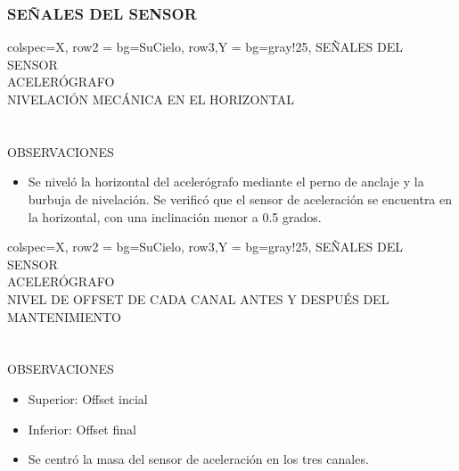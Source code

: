 \subsubsection{SEÑALES DEL SENSOR}
\begin{tblr}{
        colspec={X},
        row{2} = {bg=SuCielo},
        row{3,Y} = {bg=gray!25},
    } %
    SEÑALES DEL SENSOR \\
    ACELERÓGRAFO \MakeUppercase{} \\
    NIVELACIÓN MECÁNICA EN EL HORIZONTAL \\
      \\
     \\
    OBSERVACIONES \\
    \begin{itemize}
        \item Se niveló la horizontal del acelerógrafo mediante el perno de anclaje y la burbuja de nivelación. Se verificó que el sensor de aceleración se encuentra en la horizontal, con una inclinación menor a 0.5 grados.
    \end{itemize}
\end{tblr}
% 
\newpage
\begin{tblr}{
        colspec={X},
        row{2} = {bg=SuCielo},
        row{3,Y} = {bg=gray!25},
    } %
    SEÑALES DEL SENSOR \\
    ACELERÓGRAFO \MakeUppercase{} \\
    NIVEL DE OFFSET DE CADA CANAL ANTES Y DESPUÉS DEL MANTENIMIENTO \\
     \\
     \\
    OBSERVACIONES \\
    \begin{itemize}
        \item Superior: Offset incial
        \item Inferior: Offset final
        \item Se centró la masa del sensor de aceleración en los tres canales.
    \end{itemize}
\end{tblr}
